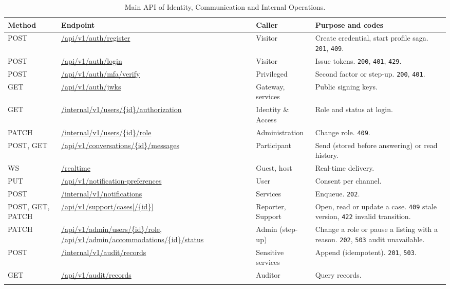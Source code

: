 \begin{longtable}{@{}L{1.5cm}L{4.8cm}L{2.5cm}L{4.8cm}@{}}
\toprule
\textbf{Method} & \textbf{Endpoint} & \textbf{Caller} & \textbf{Purpose and codes} \\
\midrule
\endhead
POST & \url{/api/v1/auth/register} & Visitor &
  Create credential, start profile saga. \texttt{201}, \texttt{409}. \\
POST & \url{/api/v1/auth/login} & Visitor &
  Issue tokens. \texttt{200}, \texttt{401}, \texttt{429}. \\
POST & \url{/api/v1/auth/mfa/verify} & Privileged &
  Second factor or step-up. \texttt{200}, \texttt{401}. \\
GET & \url{/api/v1/auth/jwks} & Gateway, services & Public signing keys. \\
GET & \url{/internal/v1/users/{id}/authorization} & Identity \& Access &
  Role and status at login. \\
PATCH & \url{/internal/v1/users/{id}/role} & Administration &
  Change role. \texttt{409}. \\
POST, GET & \url{/api/v1/conversations/{id}/messages} & Participant &
  Send (stored before answering) or read history. \\
WS & \url{/realtime} & Guest, host & Real-time delivery. \\
PUT & \url{/api/v1/notification-preferences} & User & Consent per channel. \\
POST & \url{/internal/v1/notifications} & Services & Enqueue. \texttt{202}. \\
POST, GET, PATCH & \url{/api/v1/support/cases[/{id}]} & Reporter, Support &
  Open, read or update a case. \texttt{409} stale version, \texttt{422}
  invalid transition. \\
PATCH & \url{/api/v1/admin/users/{id}/role}, \url{/api/v1/admin/accommodations/{id}/status} &
  Admin (step-up) & Change a role or pause a listing with a reason.
  \texttt{202}, \texttt{503} audit unavailable. \\
POST & \url{/internal/v1/audit/records} & Sensitive services &
  Append (idempotent). \texttt{201}, \texttt{503}. \\
GET & \url{/api/v1/audit/records} & Auditor & Query records. \\
\bottomrule
\caption{Main API of Identity, Communication and Internal Operations.}
\label{tab:id-api}
\end{longtable}
\endgroup

